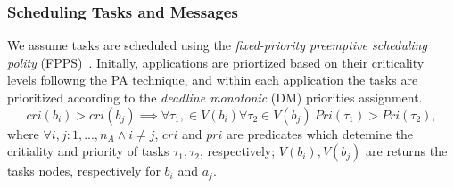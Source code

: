 {%
%



\subsubsection{Scheduling Tasks and Messages}\label{subsec_response-time_analysis}
We assume tasks are scheduled using the \textit{fixed-priority preemptive scheduling polity} (FPPS)~\cite{Sha-RTS-2004}. Initally, applications are priortized based on their criticality levels followng the PA technique, and within each application the tasks are prioritized according to the \textit{deadline monotonic} (DM) priorities assignment. 
\[
cri(b_i)>cri(b_j)\implies \forall \tau_1,\in V(b_i)\forall \tau_2\in V(b_j)\ Pri(\tau_1)>Pri(\tau_2),
\]
where $\forall i,j:1,...,n_A\land i\neq j$, $cri$ and $pri$ are predicates which detemine the critiality and priority of tasks $\tau_1,\tau_2$, respectively; $V(b_i), V(b_j)$ are returns the tasks nodes, respectively for $b_i$ and $a_j$.

}
